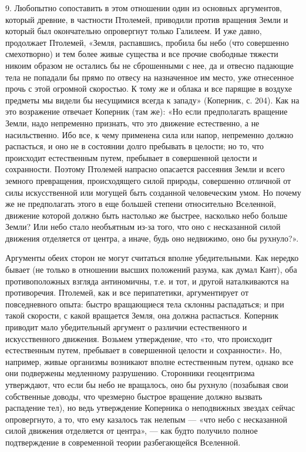 9. Любопытно сопоставить в этом отношении один из основных аргументов,
который  древние,  в  частности Птолемей,  приводили  против  вращения
Земли и  который был окончательно  опровергнут только Галилеем.  И уже
давно, продолжает  Птолемей, «Земля, распавшись, пробила  бы небо (что
совершенно  смехотворно)  и тем  более  живые  существа и  все  прочие
свободные тяжести никоим образом не  остались бы не сброшенными с нее,
да  и  отвесно  падающие  тела  не попадали  бы  прямо  по  отвесу  на
назначенное им место, уже отнесенное  прочь с этой огромной скоростью.
К  тому  же и  облака  и  все парящие  в  воздухе  предметы мы  видели
бы  несущимися  всегда  к  западу»  (Коперник, с.  204).  Как  на  это
возражение отвечает Коперник (там  же): «Но если предполагать вращение
Земли, надо  непременно признать, что  это движение естественно,  а не
насильственно. Ибо  все, к чему  применена сила или  напор, непременно
должно распасться, и оно не в  состоянии долго пребывать в целости; но
то, что происходит естественным путем, пребывает в совершенной целости
и сохранности.  Поэтому Птолемей напрасно опасается  рассеяния Земли и
всего  земного превращения,  происходящего  силой природы,  совершенно
отличной от силы искусственной или могущей быть созданной человеческим
умом.  Но  почему же  не  предполагать  этого  в еще  большей  степени
относительно  Вселенной, движение  которой  должно  быть настолько  же
быстрее, насколько небо больше Земли?  Или небо стало необъятным из-за
того, что  оно с  несказанной силой движения  отделяется от  центра, а
иначе, будь оно недвижимо, оно бы рухнуло?».

Аргументы обеих  сторон не  могут считаться вполне  убедительными. Как
нередко  бывает  (не  только  в  отношении  высших  положений  разума,
как  думал  Кант), оба  противоположных  взгляда  антиномичны, т.е.  и
тот,  и другой  наталкиваются  на противоречия.  Птолемей,  как и  все
перипатетики, аргументирует от повседневного опыта: быстро вращающиеся
тела  склонны распадаться;  и при  такой скорости,  с какой  вращается
Земля,  она должна  распасться.  Коперник  приводит мало  убедительный
аргумент о  различии естественного и искусственного  движения. Возьмем
утверждение, что  «то, что происходит естественным  путем, пребывает в
совершенной  целости и  сохранности».  Но,  например, живые  организмы
возникают  вполне  естественным  путем,   однако  все  они  подвержены
медленному разрушению. Сторонники геоцентризма утверждают, что если бы
небо не вращалось, оно бы  рухнуло (позабывая свои собственные доводы,
что чрезмерно быстрое вращение должно вызвать распадение тел), но ведь
утверждение  Коперника о  неподвижных звездах  сейчас опровергнуто,  а
то,  что  ему  казалось  так  нелепым  ---  «что  небо  с  несказанной
силой движения  отделяется от центра»,  --- как будто  получило полное
подтверждение в современной теории разбегающейся Вселенной.

